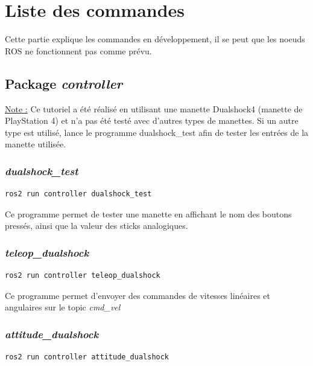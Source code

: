 \chapter{Liste des commandes }

Cette partie explique les commandes en développement, il se peut que les noeuds ROS ne fonctionnent pas comme prévu.

\section{Package \textit{controller}}

\underline{Note :} Ce tutoriel a été réalisé en utilisant une manette Dualshock4 (manette de PlayStation 4) et n'a pas été testé avec d'autres types de manettes. Si un autre type est utilisé, lance le programme dualshock\_test afin de tester les entrées de la manette utilisée.

\subsection{\textit{dualshock\_test}}

\begin{lstlisting}[style=commandstyle]
ros2 run controller dualshock_test
\end{lstlisting}

Ce programme permet de tester une manette en affichant le nom des boutons pressés, ainsi que la valeur des sticks analogiques.

\subsection{\textit{teleop\_dualshock}}
\label{partie:teleop_dualshock}

\begin{lstlisting}[style=commandstyle]
ros2 run controller teleop_dualshock
\end{lstlisting}

Ce programme permet d'envoyer des commandes de vitesses linéaires et angulaires sur le topic \textit{cmd\_vel}

\subsection{\textit{attitude\_dualshock}}

\begin{lstlisting}[style=commandstyle]
ros2 run controller attitude_dualshock
\end{lstlisting}

